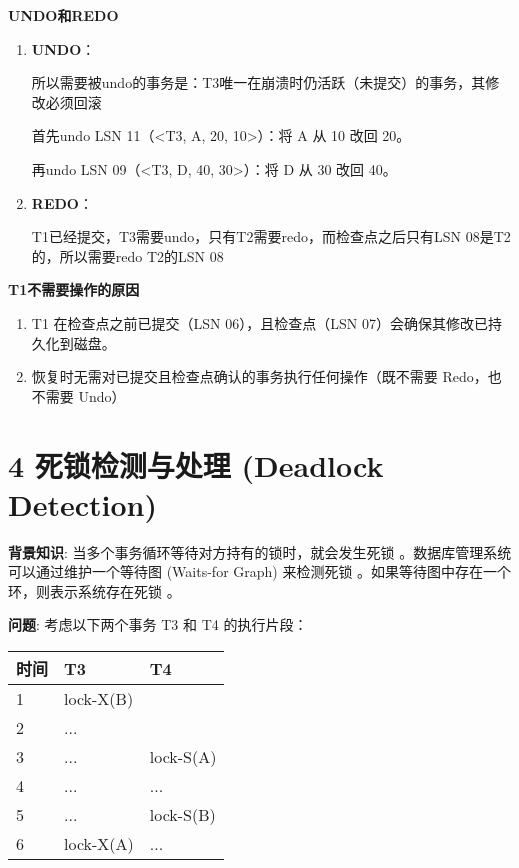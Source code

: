 \documentclass{article}
\begin{document}
	\textbf{UNDO和REDO}
	
	\begin{enumerate}[noitemsep, label={{\arabic*})}]
		\item \textbf{UNDO}：
		
		所以需要被undo的事务是：T3唯一在崩溃时仍活跃（未提交）的事务，其修改必须回滚
		
		首先undo LSN 11（<T3, A, 20, 10>）：将 A 从 10 改回 20。
		
		再undo LSN 09（<T3, D, 40, 30>）：将 D 从 30 改回 40。
		
		\item \textbf{REDO}：
		
		T1已经提交，T3需要undo，只有T2需要redo，而检查点之后只有LSN 08是T2的，所以需要redo T2的LSN 08
	\end{enumerate}\textbf{}
	
	\textbf{T1不需要操作的原因}
	
	\begin{enumerate}[noitemsep, label={{\arabic*})}]
		\item T1 在检查点之前已提交（LSN 06），且检查点（LSN 07）会确保其修改已持久化到磁盘。
		\item 恢复时无需对已提交且检查点确认的事务执行任何操作（既不需要 Redo，也不需要 Undo）
	\end{enumerate}\textbf{}
	
	
	\section*{4 死锁检测与处理 (Deadlock Detection)}
	
	\textbf{背景知识}: 当多个事务循环等待对方持有的锁时，就会发生死锁 。数据库管理系统可以通过维护一个等待图 (Waits-for Graph) 来检测死锁 。如果等待图中存在一个环，则表示系统存在死锁 。
	
	\textbf{问题}: 考虑以下两个事务 T3 和 T4 的执行片段：
	
	\begin{table}[!ht]
		\centering
		\begin{tabular}{|l|l|l|}
			\hline
			时间 & T3 & T4  \\ \hline
			1 & lock-X(B) &   \\ \hline
			2 & ... &   \\ \hline
			3 & ... & lock-S(A)  \\ \hline
			4 & ... & ...  \\ \hline
			5 & ... & lock-S(B)  \\ \hline
			6 & lock-X(A) & ...  \\ \hline
		\end{tabular}
	\end{table}
	
\end{document}
